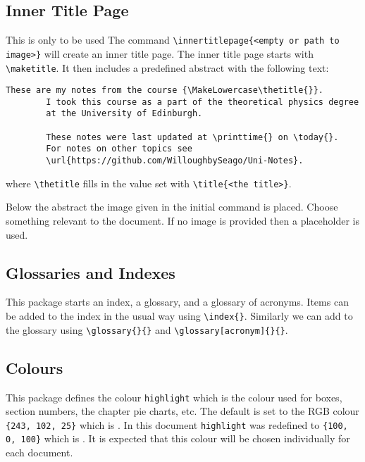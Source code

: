 \documentclass[fleqn, a4paper, openany]{memoir}
\begin{document}
    \subsection{Inner Title Page}
    This is only to be used 
    The command \verb!\innertitlepage{<empty or path to image>}! will create an inner title page. 
    The inner title page starts with \verb!\maketitle!.
    It then includes a predefined abstract with the following text:
    \begin{Verbatim}[gobble=2]
        These are my notes from the course {\MakeLowercase\thetitle{}}.
        I took this course as a part of the theoretical physics degree
        at the University of Edinburgh.
        
        These notes were last updated at \printtime{} on \today{}.
        For notes on other topics see
        \url{https://github.com/WilloughbySeago/Uni-Notes}.
    \end{Verbatim}
    where \verb!\thetitle! fills in the value set with \verb!\title{<the title>}!.
    
    Below the abstract the image given in the initial command is placed. Choose something relevant to the document. If no image is provided then a placeholder is used.
    
    \subsection{Glossaries and Indexes}
    This package starts an index, a glossary, and a glossary of acronyms.
    Items can be added to the index in the usual way using \verb!\index{}!. Similarly we can add to the glossary using \verb!\glossary{}{}! and \verb!\glossary[acronym]{}{}!.
    
    \subsection{Colours}
    This package defines the colour \verb!highlight! which is the colour used for boxes, section numbers, the chapter pie charts, etc.
    The default is set to the RGB colour \verb!{243, 102, 25}! which is . In this document \verb!highlight! was redefined to \verb!{100, 0, 100}! which is .
    It is expected that this colour will be chosen individually for each document.
    
\end{document}
